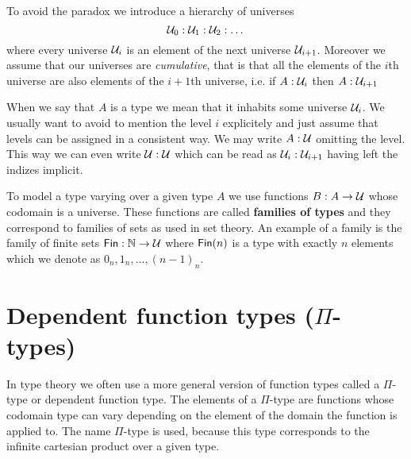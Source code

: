 To avoid the paradox we introduce a hierarchy of universes
\[ \mathcal{U}_0 : \mathcal{U}_1 : \mathcal{U}_2 : \dots \]
where every universe $\mathcal{U}_i$ is an element of the next universe
$\mathcal{U}_{i+1}$. Moreover we assume that our universes are
\emph{cumulative}, that is that all the elements of the $i$th
universe are also elements of the $i+1$th universe, i.e. if
$A:\mathcal{U}_i$ then $A:\mathcal{U}_{i+1}$


When we say that $A$ is a type we mean that it inhabits some universe
$\mathcal{U}_i$. We usually want to avoid to mention the level $i$ explicitely
and just assume that levels can be assigned in a consistent way. We
may write $A:\mathcal{U}$ omitting the level. This way we can even write
$\mathcal{U}:\mathcal{U}$ which can be read as $\mathcal{U}_i:\mathcal{U}_{i+1}$ having left the
indizes implicit. 

To model a type varying over a given type $A$ we use functions $B : A \to \mathcal{U}$  whose
codomain is a universe. These functions are called
\textbf{families of types} and they correspond to families of sets as used in
set theory. An example of a family is the family of finite sets $\mathsf{Fin}
: \mathbb{N} \to \mathcal{U}$ where $\mathsf{Fin}(n)$ is a type with exactly $n$ elements
which we denote as $0_n,1_n,\dots,(n-1)_n$. 


\section{Dependent function types (\texorpdfstring{$\Pi$}{Π}-types)}
\label{sec:pi-types}

In type theory we often use a more general version of function
types called a $\Pi$-type or dependent function type. The elements of
a $\Pi$-type are functions whose codomain type can vary depending on the
element of the domain the function is applied to. The name $\Pi$-type
is used, because this type corresponds to the infinite cartesian
product over a given type.

